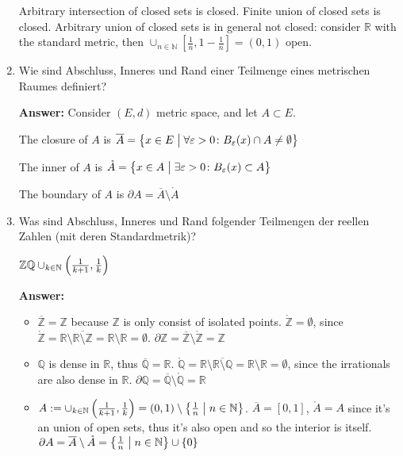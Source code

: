 \documentclass[11pt]{article}
\newcommand{\RR}[0]{\mathbb{R}}
\newcommand{\QQ}[0]{\mathbb{Q}}
\newcommand{\ZZ}[0]{\mathbb{Z}}
\newcommand{\NN}[0]{\mathbb{N}}
\begin{document}
\begin{enumerate}
    Arbitrary intersection of closed sets is closed. Finite union of closed sets is closed. Arbitrary union of closed sets is in general not closed: consider $\RR$ with the standard metric, then $\cup_{n \in \NN}\left[\frac{1}{n}, 1-\frac{1}{n}\right] = (0, 1)$ open.

    \item Wie sind Abschluss, Inneres und Rand einer Teilmenge eines metrischen Raumes definiert?

    \textbf{Answer:} Consider $(E, d)$ metric space, and let $A \subset E$.

    The closure of $A$ is $\overline{A} = \left\{x \in E \bigm| \forall \varepsilon > 0 \colon B_\varepsilon(x) \cap A \neq \emptyset \right\}$

    The inner of $A$ is $\mathring{A} = \left\{x \in A \bigm| \exists \varepsilon > 0\colon B_\varepsilon(x) \subset A \right\}$

    The boundary of $A$ is $\partial A = \overline{A} \setminus \mathring{A}$
    \item Was sind Abschluss, Inneres und Rand folgender Teilmengen der reellen Zahlen (mit deren Standardmetrik)?


    \hspace*{\fill}
    $\ZZ \hfill \QQ \hfill \cup_{k\in\NN}\left(\frac{1}{k+1}, \frac{1}{k}\right)$
    \hspace*{\fill}

    \textbf{Answer:}
    \begin{itemize}
        \item $\overline{\ZZ} = \ZZ$ because $\ZZ$ is only consist of isolated points. $\mathring{\ZZ} = \emptyset$, since $\mathring{\ZZ} = \RR \setminus \overline{\RR \setminus \ZZ} = \RR \setminus \RR = \emptyset$. $\partial \ZZ = \overline{\ZZ} \setminus \mathring{\ZZ} = \ZZ$
        \item $\QQ$ is dense in $\RR$, thus $\overline{\QQ} = \RR$. $\mathring{\QQ} = \RR \setminus \overline{\RR \setminus \QQ} = \RR \setminus \RR = \emptyset$, since the irrationals are also dense in $\RR$. $\partial\QQ = \overline{\QQ} \setminus \mathring{\QQ} = \RR$
        \item $A := \cup_{k\in\NN}\left(\frac{1}{k+1}, \frac{1}{k}\right) = (0, 1) \setminus \left\{\frac{1}{n} \bigm| n \in \NN\right\}$. $\overline{A} = [0, 1]$, $\mathring{A} = A$ since it's an union of open sets, thus it's also open and so the interior is itself. $\partial{A} = \overline{A} \setminus \mathring{A} = \left\{\frac{1}{n} \bigm| n \in \NN\right\} \cup \left\{0\right\}$
    \end{itemize}


\end{enumerate}
\end{document}
